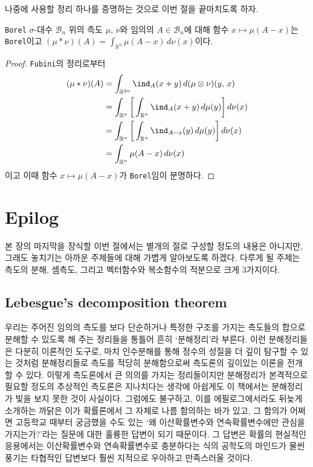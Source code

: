 나중에 사용할 정리 하나를 증명하는 것으로 이번 절을 끝마치도록 하자.

\begin{theorem}
    \texttt{Borel} $\sigma$-대수 $\mathcal{B}_n$ 위의 측도 $\mu,\,\nu$와 임의의 $A\in\mathcal{B}_n$에 대해 함수 $x\mapsto\mu(A-x)$는 \texttt{Borel}이고 $(\mu*\nu)(A)=\int_{\mathbb{R}^n}\mu(A-x)\,d\nu(x)$이다.
\end{theorem}

\begin{proof}
    \texttt{Fubini}의 정리로부터
    \begin{align*}
        (\mu*\nu)(A)&=\int_{\mathbb{R}^{2n}}\ind_A(x+y)\,d(\mu\otimes\nu)(y,\,x)\\
        &=\int_{\mathbb{R}^n}\bigg[\int_{\mathbb{R}^n}\ind_A(x+y)\,d\mu(y)\bigg]\,d\nu(x)\\
        &=\int_{\mathbb{R}^n}\bigg[\int_{\mathbb{R}^n}\ind_{A-x}(y)\,d\mu(y)\bigg]\,d\nu(x)\\
        &=\int_{\mathbb{R}^n}\mu(A-x)\,d\nu(x)
    \end{align*}
    이고 이때 함수 $x\mapsto\mu(A-x)$가 \texttt{Borel}임이 분명하다.
\end{proof}

\section{Epilog}

본 장의 마지막을 장식할 이번 절에서는 별개의 절로 구성할 정도의 내용은 아니지만, 그래도 놓치기는 아까운 주제들에 대해 가볍게 알아보도록 하겠다. 다루게 될 주제는 측도의 분해, 셈측도, 그리고 벡터함수와 복소함수의 적분으로 크게 3가지이다.

\subsection{Lebesgue's decomposition theorem}

우리는 주어진 임의의 측도를 보다 단순하거나 특정한 구조를 가지는 측도들의 합으로 분해할 수 있도록 해 주는 정리들을 통틀어 흔히 `분해정리'라 부른다. 이런 분해정리들은 다분히 이론적인 도구로, 마치 인수분해를 통해 정수의 성질을 더 깊이 탐구할 수 있는 것처럼 분해정리들로 측도를 적당히 분해함으로써 측도론의 깊이있는 이론을 전개할 수 있다. 이렇게 측도론에서 큰 의의를 가지는 정리들이지만 분해정리가 본격적으로 필요할 정도의 추상적인 측도론은 지나치다는 생각에 아쉽게도 이 책에서는 분해정리가 빛을 보지 못한 것이 사실이다. 그럼에도 불구하고, 이를 에필로그에서라도 뒤늦게 소개하는 까닭은 이가 확률론에서 그 자체로 나름 함의하는 바가 있고, 그 함의가 어쩌면 고등학교 때부터 궁금했을 수도 있는 `왜 이산확률변수와 연속확률변수에만 관심을 가지는가?'라는 질문에 대한 훌륭한 답변이 되기 때문이다. 그 답변은 확률의 현실적인 응용에서는 이산확률변수와 연속확률변수로 충분하다는 식의 공학도의 마인드가 물씬 풍기는 타협적인 답변보다 훨씬 지적으로 우아하고 만족스러울 것이다.

